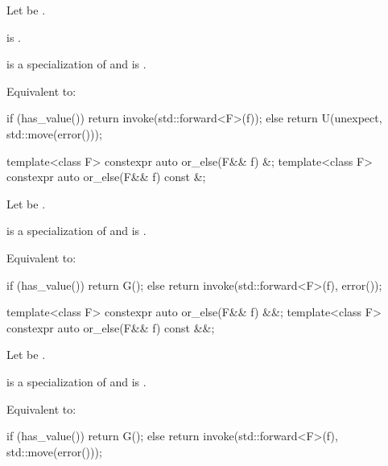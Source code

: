 \begin{itemdescr}
\pnum
Let  be .

\pnum
\constraints
{} is .

\pnum
\mandates
{} is a specialization of  and
 is .

\pnum
\effects
Equivalent to:
\begin{codeblock}
if (has_value())
  return invoke(std::forward<F>(f));
else
  return U(unexpect, std::move(error()));
\end{codeblock}
\end{itemdescr}

%
\begin{itemdecl}
template<class F> constexpr auto or_else(F&& f) &;
template<class F> constexpr auto or_else(F&& f) const &;
\end{itemdecl}

\begin{itemdescr}
\pnum
Let  be .

\pnum
\mandates
{} is a specialization of  and
 is .

\pnum
\effects
Equivalent to:
\begin{codeblock}
if (has_value())
  return G();
else
  return invoke(std::forward<F>(f), error());
\end{codeblock}
\end{itemdescr}

%
\begin{itemdecl}
template<class F> constexpr auto or_else(F&& f) &&;
template<class F> constexpr auto or_else(F&& f) const &&;
\end{itemdecl}

\begin{itemdescr}
\pnum
Let  be
.

\pnum
\mandates
{} is a specialization of  and
 is .

\pnum
\effects
Equivalent to:
\begin{codeblock}
if (has_value())
  return G();
else
  return invoke(std::forward<F>(f), std::move(error()));
\end{codeblock}
\end{itemdescr}

